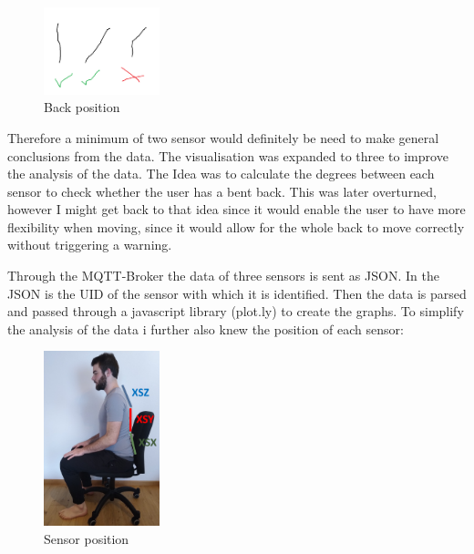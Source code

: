 \begin{figure}[h]
  \begin{center}
\includegraphics[width=0.3\textwidth]{images/Backposition.png}
  \end{center}
  \caption{Back position}
  \label{fig:BackPos}
\end{figure}

Therefore a minimum of two sensor would definitely be need to make general conclusions from the data. The visualisation was expanded to three to improve the analysis of the data.  The Idea was to calculate the degrees between each sensor to check whether the user has a bent back. This was later overturned, however I might get back to that idea since it would enable the user to have more flexibility when moving, since it would allow for the whole back to move correctly without triggering a warning.

Through the MQTT-Broker the data of three sensors is sent as JSON. In the JSON is the UID of the sensor with which it is identified. Then the data is parsed and passed through a javascript library (plot.ly) \cite{ModernAn18:online} to create the graphs. To simplify the analysis of the data i further also knew the position of each sensor:

\begin{figure}[h]
  \begin{center}
\includegraphics[width=0.3\textwidth]{images/ChairVisualised.png}
  \end{center}
  \caption{Sensor position}
  \label{fig:BackPos}
\end{figure}

